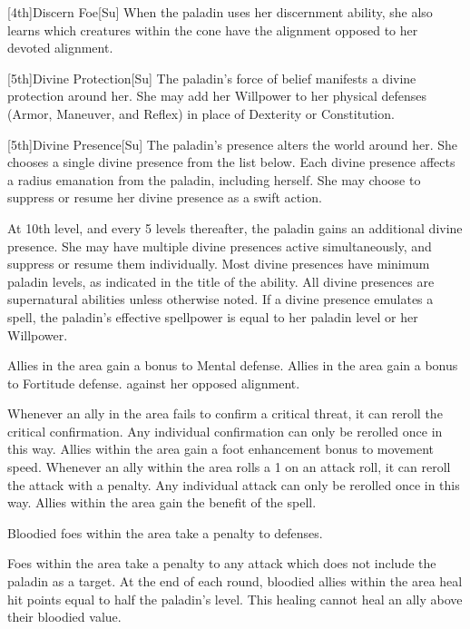 [4th]{Discern Foe}[Su]
When the paladin uses her discernment ability, she also learns which creatures within the cone have the alignment opposed to her devoted alignment.

[5th]{Divine Protection}[Su]
The paladin's force of belief manifests a divine protection around her.
She may add her Willpower to her physical defenses (Armor, Maneuver, and Reflex) in place of Dexterity or Constitution.

[5th]{Divine Presence}[Su]
The paladin's presence alters the world around her.
She chooses a single divine presence from the list below.
Each divine presence affects a \arealarge radius emanation from the paladin, including herself.
She may choose to suppress or resume her divine presence as a swift action.

At 10th level, and every 5 levels thereafter, the paladin gains an additional divine presence.
She may have multiple divine presences active simultaneously, and suppress or resume them individually.
Most divine presences have minimum paladin levels, as indicated in the title of the ability.
All divine presences are supernatural abilities unless otherwise noted.
If a divine presence emulates a spell, the paladin's effective spellpower is equal to her paladin level or her Willpower.

Allies in the area gain a  bonus to Mental defense.
Allies in the area gain a  bonus to Fortitude defense.
against her opposed alignment.

Whenever an ally in the area fails to confirm a critical threat, it can reroll the critical confirmation.
Any individual confirmation can only be rerolled once in this way.
Allies within the area gain a  foot enhancement bonus to movement speed.
Whenever an ally within the area rolls a 1 on an attack roll, it can reroll the attack with a  penalty.
Any individual attack can only be rerolled once in this way.
 Allies within the area gain the benefit of the 
spell.

Bloodied foes within the area take a  penalty to defenses.

Foes within the area take a  penalty to any attack which does not include the paladin as a target.
At the end of each round, bloodied allies within the area heal hit points equal to half the paladin's level.
This healing cannot heal an ally above their bloodied value.

